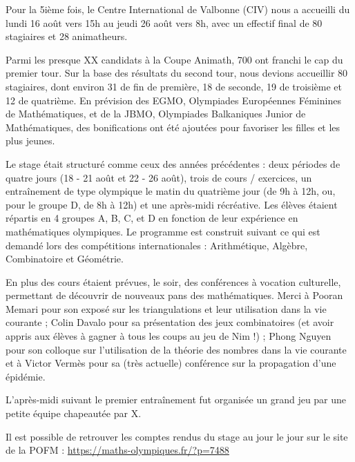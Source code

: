 
Pour la 5ième fois, le Centre International de Valbonne (CIV) nous a accueilli du lundi 16 août vers 15h au jeudi 26 août vers 8h, avec un effectif final de 80 stagiaires et 28 animatheurs. 

Parmi les presque XX candidats à la Coupe Animath, 700 ont franchi le cap du premier tour. Sur la base des résultats du second tour, nous devions accueillir 80 stagiaires, dont environ 31 de fin de première, 18 de seconde, 19 de troisième et 12 de quatrième. En prévision des EGMO, Olympiades Européennes Féminines de Mathématiques, et de la JBMO, Olympiades Balkaniques Junior de Mathématiques,  des bonifications ont été ajoutées pour favoriser les filles et les plus jeunes.




Le stage était structuré comme ceux des années précédentes : deux périodes de quatre jours (18 - 21 août et 22 - 26 août), trois de cours / exercices, un entraînement %
de type olympique le matin du quatrième jour (de 9h à 12h, ou, pour le groupe D, de 8h à 12h) et une après-midi récréative. Les élèves étaient répartis en 4 groupes A, B, C, et D en fonction de leur expérience en mathématiques olympiques.
Le programme est construit suivant ce qui est demandé lors des compétitions internationales : Arithmétique, Algèbre, Combinatoire et Géométrie.



En plus des cours étaient prévues, le soir, des conférences à vocation culturelle, permettant de découvrir de nouveaux pans des mathématiques. Merci à Pooran Memari pour son exposé sur les triangulations et leur utilisation dans la vie courante ; Colin Davalo pour sa présentation des jeux combinatoires (et avoir appris aux élèves à gagner à tous les coups au jeu de Nim !) ; Phong Nguyen pour son colloque sur l'utilisation de la théorie des nombres dans la vie courante et à  Victor Vermès pour sa (très actuelle) conférence sur la propagation d'une épidémie.



L'après-midi suivant le premier entraînement fut organisée un grand jeu par une petite équipe chapeautée par X. %


Il est possible de retrouver les comptes rendus du stage au jour le jour sur le site de la POFM : \url{https://maths-olympiques.fr/?p=7488}

\vfill
\pagebreak
